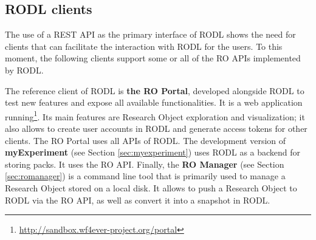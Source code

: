 \subsection{RODL clients}

The use of a REST API as the primary interface of RODL shows the need for clients that can facilitate the interaction with RODL for the users. To this moment, the following clients support some or all of the RO APIs implemented by RODL.

The reference client of RODL is \textbf{the RO Portal}, developed alongside RODL to test new features and expose all available functionalities. It is a web application running\footnote{\url{http://sandbox.wf4ever-project.org/portal}}. Its main features are Research Object exploration and visualization; it also allows to create user accounts in RODL and generate access tokens for other clients. The RO Portal uses all APIs of RODL. %
The development version of \textbf{myExperiment} (see Section \ref{sec:myexperiment})%
uses RODL as a backend for storing packs. It uses the RO API. Finally, the \textbf{RO Manager} (see Section \ref{sec:romanager}) %
is a command line tool that is primarily used to manage a Research Object stored on a local disk. It allows to push a Research Object to RODL via the RO API, as well as convert it into a snapshot in RODL.

